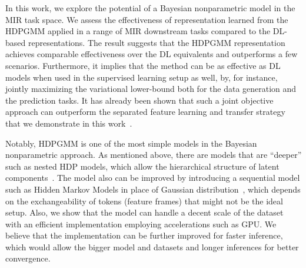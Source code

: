 \documentclass{article}
\begin{document}
In this work, we explore the potential of a Bayesian nonparametric model in the MIR task space. We assess the effectiveness of representation learned from the HDPGMM applied in a range of MIR downstream tasks compared to the DL-based representations. The result suggests that the HDPGMM representation achieves comparable effectiveness over the DL equivalents and outperforms a few scenarios. Furthermore, it implies that the method can be as effective as DL models when used in the supervised learning setup as well, by, for instance, jointly maximizing the variational lower-bound both for the data generation and the prediction tasks. It has already been shown that such a joint objective approach can outperform the separated feature learning and transfer strategy that we demonstrate in this work~\cite{DBLP:journals/taffco/WangLCCH15}.

Notably, HDPGMM is one of the most simple models in the Bayesian nonparametric approach. As mentioned above, there are models that are ``deeper'' such as nested HDP models, which allow the hierarchical structure of latent components~\cite{DBLP:journals/pami/PaisleyWBJ15}. The model also can be improved by introducing a sequential model such as Hidden Markov Models in place of Gaussian distribution~\cite{DBLP:conf/icassp/QiPC07}, which depends on the exchangeability of tokens (feature frames) that might not be the ideal setup. Also, we show that the model can handle a decent scale of the dataset with an efficient implementation employing accelerations such as GPU. We believe that the implementation can be further improved for faster inference, which would allow the bigger model and datasets and longer inferences for better convergence.



\end{document}
